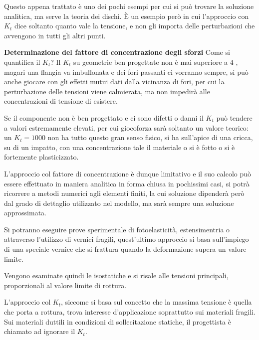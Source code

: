 \documentclass{article}
\begin{document}
\begin{adjustwidth}{2in}{}
\begin{figure}[H]
		\end{figure}
		
		Questo appena trattato è uno dei pochi esempi per cui si può trovare la soluzione analitica, ma serve la teoria dei dischi. È un esempio però in cui l'approccio con $K_t$ dice soltanto quanto vale la tensione, e non gli importa delle perturbazioni che avvengono in tutti gli altri punti. \newline 
		
		\textbf{{\Large Determinazione del fattore di concentrazione degli sforzi }} \newline 
		Come si quantifica il $K_t$? Il $K_t$ su geometrie ben progettate non è mai superiore a 4 , magari una flangia va imbullonata e dei fori passanti ci vorranno sempre, si può anche giocare con gli effetti mutui dati dalla vicinanza di fori, per cui la perturbazione delle tensioni viene calmierata, ma non impedirà alle concentrazioni di tensione di esistere. 
		
		Se il componente non è ben progettato e ci sono difetti o danni il $K_t$ può tendere a valori estremamente elevati, per cui giocoforza sarà soltanto un valore teorico: un $K_t=1000$ non ha tutto questo gran senso fisico, si ha sull'apice di una cricca, su di un impatto, con una concentrazione tale il materiale o si è fotto o si è fortemente plasticizzato. \newline 
		
		L'approccio col fattore di concentrazione è dunque limitativo e il suo calcolo può essere effettuato in maniera analitica in forma chiusa in pochissimi casi, si potrà ricorrere a metodi numerici agli elementi finiti, la cui soluzione dipenderà però dal grado di dettaglio utilizzato nel modello, ma sarà sempre una soluzione approssimata. 
		
		Si potranno eseguire prove sperimentale di fotoelasticità, estensimentria o attraverso l'utilizzo di vernici fragili, quest'ultimo approccio si basa sull’impiego di una speciale vernice che si frattura
		quando la deformazione supera un valore limite.
		
		Vengono esaminate quindi le isostatiche e si risale alle
		tensioni principali, proporzionali al valore limite di rottura. \newline
		
		L'approccio col $K_t$, siccome si basa sul concetto che la massima tensione è quella che porta a rottura, trova interesse d'applicazione soprattutto sui materiali fragili. Sui materiali duttili in condizioni di sollecitazione statiche, il progettista è chiamato ad ignorare il $K_t$. \newline 
		

\end{adjustwidth}
\end{document}
